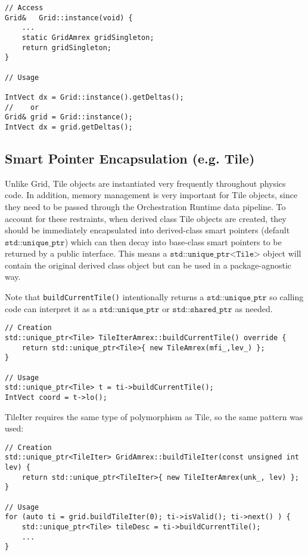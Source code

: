 \documentclass[letterpaper,12pt]{article}
\begin{document}
\begin{verbatim}
// Access
Grid&   Grid::instance(void) {
    ...
    static GridAmrex gridSingleton;
    return gridSingleton;
}

// Usage

IntVect dx = Grid::instance().getDeltas();
//    or
Grid& grid = Grid::instance();
IntVect dx = grid.getDeltas();
\end{verbatim}


\subsection{Smart Pointer Encapsulation (e.g. Tile)}

Unlike Grid, Tile objects are instantiated very frequently throughout physics code. In addition, memory management is very important for Tile objects, since they need to be passed through the Orchestration Runtime data pipeline. To account for these restraints, when derived class Tile objects are created, they should be immediately encapsulated into derived-class smart pointers (default $\texttt{std::unique\_ptr}$) which can then decay into base-class smart pointers to be returned by a public interface. This means a $\texttt{std::unique\_ptr<Tile>}$ object will contain the original derived class object but can be used in a package-agnostic way.

Note that \texttt{buildCurrentTile()}  intentionally returns a $\texttt{std::unique\_ptr}$ so calling code can interpret it as a $\texttt{std::unique\_ptr}$ or $\texttt{std::shared\_ptr}$ as needed.

\begin{verbatim}
// Creation
std::unique_ptr<Tile> TileIterAmrex::buildCurrentTile() override {
    return std::unique_ptr<Tile>{ new TileAmrex(mfi_,lev_) };
}

// Usage
std::unique_ptr<Tile> t = ti->buildCurrentTile();
IntVect coord = t->lo();
\end{verbatim}

TileIter requires the same type of polymorphism as Tile, so the same pattern was used:
\begin{verbatim}
// Creation
std::unique_ptr<TileIter> GridAmrex::buildTileIter(const unsigned int lev) {
    return std::unique_ptr<TileIter>{ new TileIterAmrex(unk_, lev) };
}

// Usage
for (auto ti = grid.buildTileIter(0); ti->isValid(); ti->next() ) {
    std::unique_ptr<Tile> tileDesc = ti->buildCurrentTile();
    ...
}


\end{verbatim}
\end{document}
